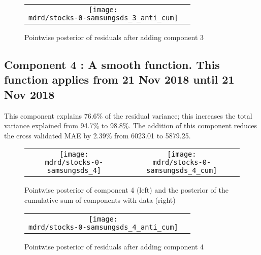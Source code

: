 \documentclass{article} %
\begin{document}
\begin{figure}[H]
\newcommand{\wmgd}{0.5\columnwidth}
\newcommand{\hmgd}{3.0cm}
\newcommand{\mdrd}{stocks-0-samsungsds}
\newcommand{\mbm}{\hspace{-0.3cm}}
\begin{tabular}{cc}
\mbm \texttt{[image: \\mdrd/stocks-0-samsungsds\_3\_anti\_cum]}
\end{tabular}
\caption{Pointwise posterior of residuals after adding component 3}
\label{fig:comp3}
\end{figure}

\subsection{Component 4 : A smooth function. This function applies from 21 Nov 2018 until 21 Nov 2018}



This component explains 76.6\% of the residual variance; this increases the total variance explained from 94.7\% to 98.8\%.
The addition of this component reduces the cross validated MAE by 2.39\% from 6023.01 to 5879.25.


\begin{figure}[H]
\newcommand{\wmgd}{0.5\columnwidth}
\newcommand{\hmgd}{3.0cm}
\newcommand{\mdrd}{stocks-0-samsungsds}
\newcommand{\mbm}{\hspace{-0.3cm}}
\begin{tabular}{cc}
\mbm \texttt{[image: \\mdrd/stocks-0-samsungsds\_4]} & \texttt{[image: \\mdrd/stocks-0-samsungsds\_4\_cum]}
\end{tabular}
\caption{Pointwise posterior of component 4 (left) and the posterior of the cumulative sum of components with data (right)}
\label{fig:comp4}
\end{figure}

\begin{figure}[H]
\newcommand{\wmgd}{0.5\columnwidth}
\newcommand{\hmgd}{3.0cm}
\newcommand{\mdrd}{stocks-0-samsungsds}
\newcommand{\mbm}{\hspace{-0.3cm}}
\begin{tabular}{cc}
\mbm \texttt{[image: \\mdrd/stocks-0-samsungsds\_4\_anti\_cum]}
\end{tabular}
\caption{Pointwise posterior of residuals after adding component 4}
\label{fig:comp4}
\end{figure}
\end{document}
